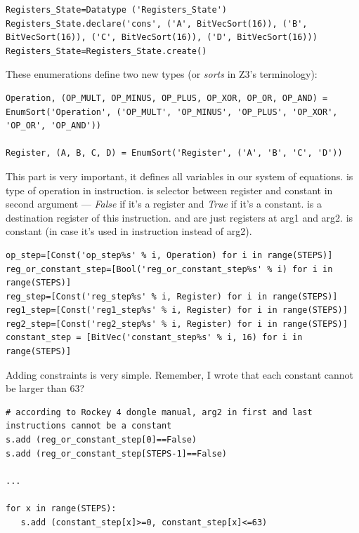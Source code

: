\begin{lstlisting}
Registers_State=Datatype ('Registers_State')
Registers_State.declare('cons', ('A', BitVecSort(16)), ('B', BitVecSort(16)), ('C', BitVecSort(16)), ('D', BitVecSort(16)))
Registers_State=Registers_State.create()
\end{lstlisting}

These enumerations define two new types (or \emph{sorts} in Z3's terminology):

\begin{lstlisting}
Operation, (OP_MULT, OP_MINUS, OP_PLUS, OP_XOR, OP_OR, OP_AND) = EnumSort('Operation', ('OP_MULT', 'OP_MINUS', 'OP_PLUS', 'OP_XOR', 'OP_OR', 'OP_AND'))

Register, (A, B, C, D) = EnumSort('Register', ('A', 'B', 'C', 'D'))
\end{lstlisting}

This part is very important, it defines all variables in our system of equations. 
 is type of operation in instruction.
 is selector between register and constant in second argument ---
\emph{False} if it's a register and \emph{True} if it's a constant. 
 is a destination register of this instruction. 
 and  are just registers at arg1 and arg2. 
 is constant (in case it's used in instruction instead of arg2).

\begin{lstlisting}
op_step=[Const('op_step%s' % i, Operation) for i in range(STEPS)]
reg_or_constant_step=[Bool('reg_or_constant_step%s' % i) for i in range(STEPS)]
reg_step=[Const('reg_step%s' % i, Register) for i in range(STEPS)]
reg1_step=[Const('reg1_step%s' % i, Register) for i in range(STEPS)]
reg2_step=[Const('reg2_step%s' % i, Register) for i in range(STEPS)]
constant_step = [BitVec('constant_step%s' % i, 16) for i in range(STEPS)]
\end{lstlisting}

Adding constraints is very simple. Remember, I wrote that each constant cannot be larger than 63?

\begin{lstlisting}
# according to Rockey 4 dongle manual, arg2 in first and last instructions cannot be a constant
s.add (reg_or_constant_step[0]==False)
s.add (reg_or_constant_step[STEPS-1]==False)

...

for x in range(STEPS):
   s.add (constant_step[x]>=0, constant_step[x]<=63)
\end{lstlisting}

